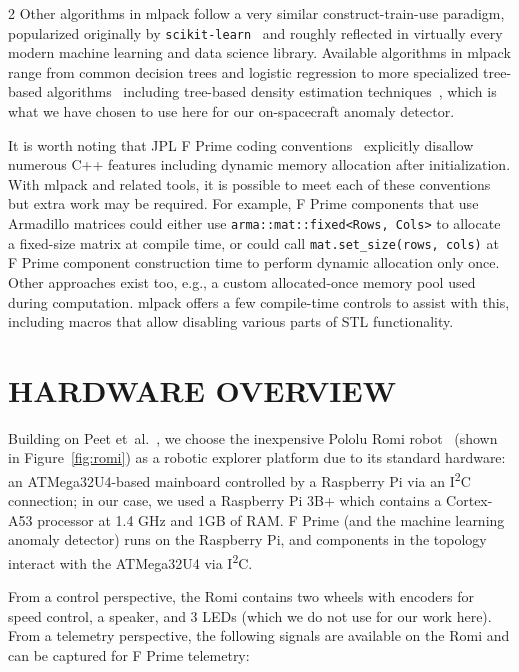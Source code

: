 \documentclass[10pt, fleqn]{article}
\begin{document}
\begin{multicols*}{2}
Other algorithms in mlpack follow a very similar
construct-train-use paradigm,
popularized originally by {\tt \small scikit-learn}~\cite{buitinck2013api}
and roughly reflected in
virtually every modern machine learning and data science library.
Available algorithms in mlpack range from
common decision trees and logistic regression to
more specialized tree-based algorithms~\cite{curtin2013tree}
including tree-based density estimation techniques~\cite{gray2003nonparametric,ram2011density},
which is what we have chosen to use here
for our on-spacecraft anomaly detector.

It is worth noting that JPL F Prime coding conventions~\cite{jplstandards}
explicitly disallow numerous C++ features
including dynamic memory allocation after initialization.
With mlpack and related tools,
it is possible to meet each of these conventions
but extra work may be required.
For example, F Prime components that use Armadillo matrices
could either use {\tt \small arma::mat::fixed<Rows, Cols>}
to allocate a fixed-size matrix at compile time,
or could call {\tt \small mat.set\_size(rows, cols)}
at F Prime component construction time to perform dynamic allocation only once.
Other approaches exist too,
e.g., a custom allocated-once memory pool used during computation.
mlpack offers a few compile-time controls to assist with this,
including macros that allow disabling various parts of STL functionality.

\section{HARDWARE OVERVIEW}

Building on Peet et~al.~\cite{peet2024framework},
we choose the inexpensive Pololu Romi robot~\cite{PololuRomi}
(shown in Figure~\ref{fig:romi})
as a robotic explorer platform
due to its standard hardware:
an ATMega32U4-based mainboard
controlled by a Raspberry Pi via an I\textsuperscript{2}C connection;
in our case, we used a Raspberry Pi 3B+
which contains a Cortex-A53 processor at 1.4 GHz
and 1GB of RAM.
F Prime (and the machine learning anomaly detector) runs on the Raspberry Pi,
and components in the topology interact with the ATMega32U4
via I\textsuperscript{2}C.

From a control perspective,
the Romi contains two wheels with encoders for speed control,
a speaker,
and 3 LEDs (which we do not use for our work here).
From a telemetry perspective,
the following signals are available on the Romi
and can be captured for F Prime telemetry:


\end{multicols*}
\end{document}
